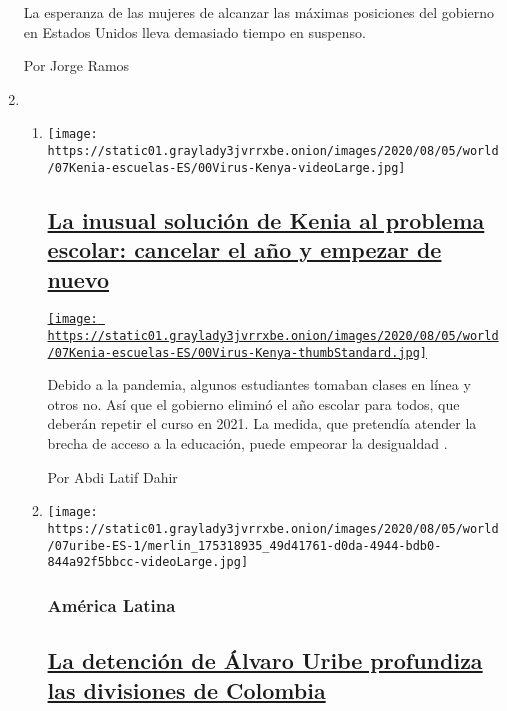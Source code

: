 \begin{enumerate}
  La esperanza de las mujeres de alcanzar las máximas posiciones del
  gobierno en Estados Unidos lleva demasiado tiempo en suspenso.

  Por Jorge Ramos
\item
  \begin{enumerate}
  \def\labelenumii{\arabic{enumii}.}
  \item
    \texttt{[image: https://static01.graylady3jvrrxbe.onion/images/2020/08/05/world/07Kenia-escuelas-ES/00Virus-Kenya-videoLarge.jpg]}

    \hypertarget{la-inusual-soluciuxf3n-de-kenia-al-problema-escolar-cancelar-el-auxf1o-y-empezar-de-nuevo}{%
    \subsection{\texorpdfstring{\href{/es/2020/08/07/espanol/mundo/cierre-escuela-coronavirus-kenia.html}{La
    inusual solución de Kenia al problema escolar: cancelar el año y
    empezar de
    nuevo}}{La inusual solución de Kenia al problema escolar: cancelar el año y empezar de nuevo}}\label{la-inusual-soluciuxf3n-de-kenia-al-problema-escolar-cancelar-el-auxf1o-y-empezar-de-nuevo}}

    \href{/es/2020/08/07/espanol/mundo/cierre-escuela-coronavirus-kenia.html}{\texttt{[image: https://static01.graylady3jvrrxbe.onion/images/2020/08/05/world/07Kenia-escuelas-ES/00Virus-Kenya-thumbStandard.jpg]}}

    Debido a la pandemia, algunos estudiantes tomaban clases en línea y
    otros no. Así que el gobierno eliminó el año escolar para todos, que
    deberán repetir el curso en 2021. La medida, que pretendía atender
    la brecha de acceso a la educación, puede empeorar la desigualdad .

    Por Abdi Latif Dahir
  \item
    \texttt{[image: https://static01.graylady3jvrrxbe.onion/images/2020/08/05/world/07uribe-ES-1/merlin\_175318935\_49d41761-d0da-4944-bdb0-844a92f5bbcc-videoLarge.jpg]}

    \hypertarget{amuxe9rica-latina}{%
    \subsubsection{América Latina}\label{amuxe9rica-latina}}

    \hypertarget{la-detenciuxf3n-de-uxe1lvaro-uribe-profundiza-las-divisiones-de-colombia}{%
    \subsection{\texorpdfstring{\href{/es/2020/08/07/espanol/america-latina/alvaro-uribe-colombia.html}{La
    detención de Álvaro Uribe profundiza las divisiones de
    Colombia}}{La detención de Álvaro Uribe profundiza las divisiones de Colombia}}\label{la-detenciuxf3n-de-uxe1lvaro-uribe-profundiza-las-divisiones-de-colombia}}


\end{enumerate}
\end{enumerate}
